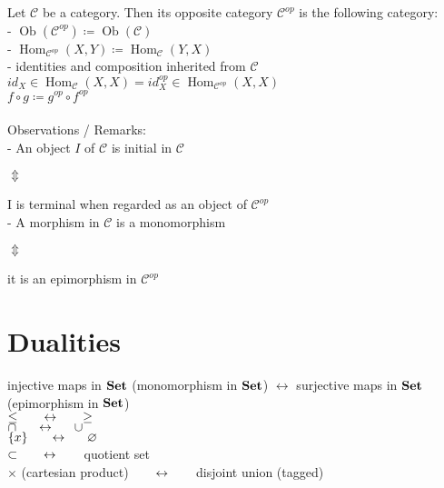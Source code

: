 \documentclass[a4paper, twoside, english, 11pt]{book}
\newcommand{\braces}[1] {\left \{ #1 \right \}}
\DeclareMathOperator{\Hom}{Hom}
\DeclareMathOperator{\Ob}{Ob}
\newcommand{\C}{\mathcal C}
\newcommand{\catname}[1]{{\normalfont\textbf{#1}}}
\newcommand{\Set}{\catname{Set}}
\let\emptyset\varnothing
\begin{document}
\noindent
Let $\C$ be a category. Then its opposite category $\C^{op}$ is the following category: \\

- $\Ob(\C^{op}) \coloneqq \Ob(\C)$ \\

- $\Hom_{\C^{op}}(X, Y) \coloneqq \Hom_\C(Y, X)$ \\

- identities and composition inherited from $\C$ \\
\indent\indent
$id_X \in \Hom_\C(X, X) = id_X^{op} \in \Hom_{\C^{op}}(X, X)$ \\
\indent\indent
$f \circ g \coloneqq g^{op} \circ f^{op}$ \\\\

\noindent
Observations / Remarks: \\

- An object $I$ of $\C$ is initial in $\C$

\indent\indent
$\Updownarrow$ %

\indent
I is terminal when regarded as an object of $\C^{op}$ \\

- A morphism in $\C$ is a monomorphism

\indent\indent
$\Updownarrow$ %

\indent
it is an epimorphism in $\C^{op}$ \\



\section{Dualities}

\noindent
injective maps in $\Set$ (monomorphism in $\Set$) $\leftrightarrow$ surjective maps in $\Set$ (epimorphism in $\Set$) \\

\noindent
$\leq \indent \leftrightarrow \indent \geq$ \\

\noindent
$\cap \indent \leftrightarrow \indent \cup$ \\

\noindent
$\braces{x} \indent \leftrightarrow \indent \emptyset$ \\

\noindent
$\subset \indent \leftrightarrow \indent$ quotient set \\

\noindent
$\times$ (cartesian product) $\indent \leftrightarrow \indent$ disjoint union (tagged) \\
\end{document}
